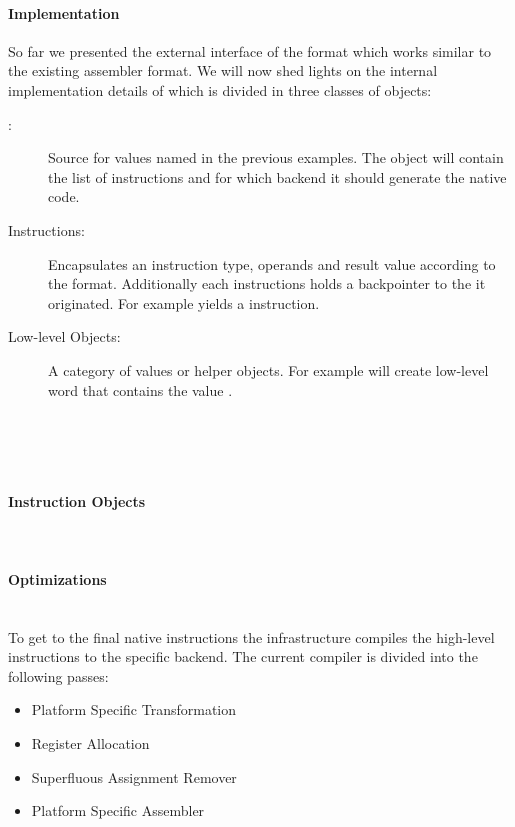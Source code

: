\paragraph{\VCPU Implementation}
So far we presented the external interface of the \VCPU format which works similar to the existing \B assembler format.
We will now shed lights on the internal implementation details of \VCPU which is divided in three classes of objects:
%
\begin{description}
	\item[\CPUs:] Source for values named  in the previous examples.
	The \CPU object will contain the list of instructions and for which backend it should generate the native code.
	
	\item[Instructions:] Encapsulates an instruction type, operands and result value according to the \TAC format.
	Additionally each instructions holds a backpointer to the \CPU it originated.
	For example  yields a \VCPU instruction.
	
	\item[Low-level Objects:] A category of values or helper objects.
	For example  will create low-level word that contains the value .
\end{description}



 \\
 \\
 \\

\paragraph{Instruction Objects}

 \\

\paragraph{\VCPU Optimizations}
 \\

To get to the final native instructions the \VCPU infrastructure compiles the high-level instructions to the specific backend.
The current compiler is divided into the following passes:
%
\begin{itemize}[noitemsep]
\item Platform Specific Transformation
\item Register Allocation
\item Superfluous Assignment Remover
\item Platform Specific Assembler
\end{itemize}



